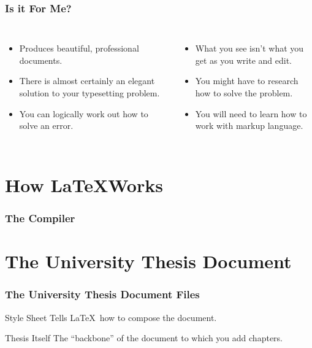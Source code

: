 \documentclass{beamer}
\begin{document}
\begin{frame}
\frametitle{Is it For Me?}
\begin{columns}
\begin{itemize}
	\item Produces beautiful, professional documents.
	\item There is almost certainly an elegant solution to your typesetting problem.
	\item You can logically work out how to solve an error.
\end{itemize}
\begin{itemize}
	\item What you see isn’t what you get as you write and edit.
	\item You might have to research how to solve the problem.
	\item You will need to learn how to work with markup language.
\end{itemize}
\end{columns}

\end{frame}

\section{How \LaTeX Works}

\begin{frame} \frametitle{The Compiler}
\end{frame}

\section{The University Thesis Document}

\begin{frame} \frametitle{The University Thesis Document Files}
\begin{block}{Style Sheet}
Tells \LaTeX \ how to compose the document.
\end{block}
\begin{block}{Thesis Itself}
The ``backbone'' of the document to which you add chapters.
\end{block}
\end{frame}
\end{document}
